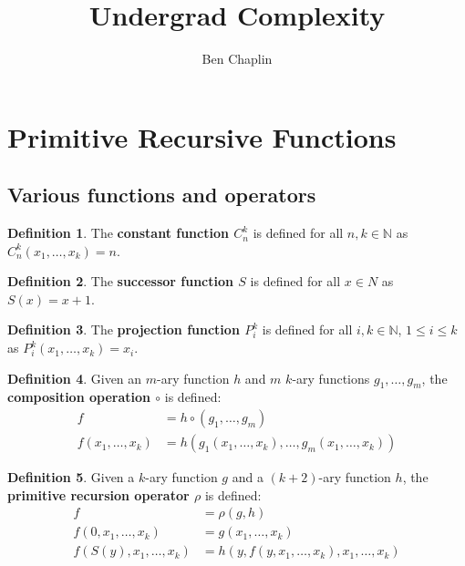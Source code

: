 \documentclass[11pt]{article}
\title{Undergrad Complexity}
\author{Ben Chaplin}
\date{}
\theoremstyle{plain}
\theoremstyle{definition}
\newtheorem*{defn}{Definition}
\newcommand{\N}{\mathbb{N}}
\begin{document}
\maketitle
\tableofcontents

\section{Primitive Recursive Functions}
\subsection{Various functions and operators}

\begin{defn}
	The {\bf constant function $C^k_n$} is defined for all $n, k \in \N$ as $C^k_n(x_1, \ldots, x_k) = n$.
\end{defn}

\begin{defn}
	The {\bf successor function $S$} is defined for all $x \in N$ as $S(x) = x + 1$.
\end{defn}

\begin{defn}
	The {\bf projection function $P^k_i$} is defined for all $i, k \in \N$, $1 \leq i \leq k$ as
	$P^k_i(x_1, \ldots, x_k) = x_i$.
\end{defn}

\begin{defn}
	Given an $m$-ary function $h$ and $m$ $k$-ary functions $g_1, \ldots, g_m$, the {\bf composition operation $\circ$}
	is defined:
	\begin{align*}
		f                   & = h \circ (g_1, \ldots, g_m)                              \\
		f(x_1, \ldots, x_k) & = h(g_1(x_1, \ldots, x_k), \ldots, g_m(x_1, \ldots, x_k))
	\end{align*}
\end{defn}

\begin{defn}
	Given a $k$-ary function $g$ and a $(k + 2)$-ary function $h$, the {\bf primitive recursion operator $\rho$} is defined:
	\begin{align*}
		f                         & = \rho(g, h)                                     \\
		f(0, x_1, \ldots, x_k)    & = g(x_1, \ldots, x_k)                            \\
		f(S(y), x_1, \ldots, x_k) & = h(y, f(y, x_1, \ldots, x_k), x_1, \ldots, x_k)
	\end{align*}
\end{defn}
\end{document}
